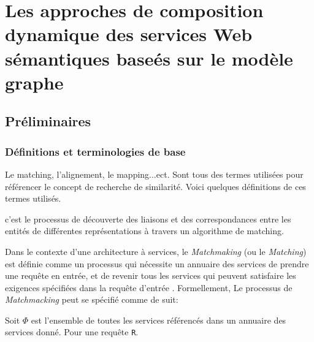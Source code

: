 \chapter{Les approches de composition dynamique des services Web sémantiques baseés sur le modèle graphe}
\newpage
\section{Préliminaires}
  \subsection{Définitions et terminologies de base}
  \label{sec:match-des-serv}
  Le matching, l'alignement, le mapping...ect. Sont tous des termes
  utilisées pour référencer le concept de recherche de
  similarité. Voici quelques définitions de ces termes utilisés.

  \begin{mydef}[Matching]
    c'est le processus de découverte des liaisons et des
    correspondances entre les entités de différentes représentations à
    travers un algorithme de matching.
  \end{mydef}


  Dans le contexte d'une architecture à services, le
  \textit{Matchmaking} (ou le \textit{Matching}) est définie comme un
  processus qui nécessite un annuaire des services de prendre une
  requête en entrée, et de revenir tous les services qui peuvent
  satisfaire les exigences spécifiées dans la requête d'entrée
  \cite{li2004software}. Formellement, Le processus de
  \textit{Matchmacking} peut se spécifié comme de suit:

  Soit $\Phi$ est l'ensemble de toutes les services référencés dans un
  annuaire des services donné. Pour une requête \verb|R|.

